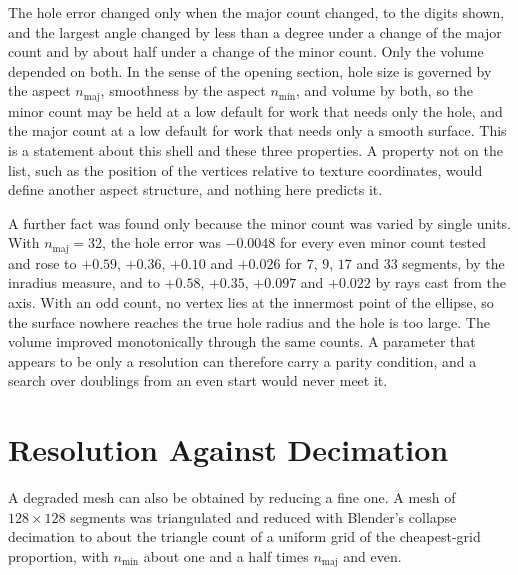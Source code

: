 The hole error changed only when the major count changed, to the digits shown, and the largest angle changed by less than a degree under a change of the major count and by about half under a change of the minor count. Only the volume depended on both. In the sense of the opening section, hole size is governed by the aspect $n_{\mathrm{maj}}$, smoothness by the aspect $n_{\mathrm{min}}$, and volume by both, so the minor count may be held at a low default for work that needs only the hole, and the major count at a low default for work that needs only a smooth surface. This is a statement about this shell and these three properties. A property not on the list, such as the position of the vertices relative to texture coordinates, would define another aspect structure, and nothing here predicts it.

A further fact was found only because the minor count was varied by single units. With $n_{\mathrm{maj}}=32$, the hole error was $-0.0048$ for every even minor count tested and rose to $+0.59$, $+0.36$, $+0.10$ and $+0.026$ for $7$, $9$, $17$ and $33$ segments, by the inradius measure, and to $+0.58$, $+0.35$, $+0.097$ and $+0.022$ by rays cast from the axis. With an odd count, no vertex lies at the innermost point of the ellipse, so the surface nowhere reaches the true hole radius and the hole is too large. The volume improved monotonically through the same counts. A parameter that appears to be only a resolution can therefore carry a parity condition, and a search over doublings from an even start would never meet it.

\section{Resolution Against Decimation}

A degraded mesh can also be obtained by reducing a fine one. A mesh of $128\times 128$ segments was triangulated and reduced with Blender's collapse decimation to about the triangle count of a uniform grid of the cheapest-grid proportion, with $n_{\mathrm{min}}$ about one and a half times $n_{\mathrm{maj}}$ and even.

